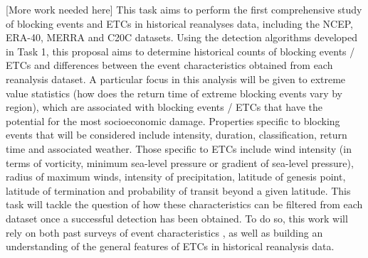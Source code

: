 \documentclass[11pt]{article}
\begin{document}

{\color{red}[More work needed here]} This task aims to perform the first comprehensive study of blocking events and ETCs in historical reanalyses data, including the NCEP, ERA-40, MERRA and C20C datasets.  Using the detection algorithms developed in Task 1, this proposal aims to determine historical counts of blocking events / ETCs and differences between the event characteristics obtained from each reanalysis dataset.  A particular focus in this analysis will be given to extreme value statistics (how does the return time of extreme blocking events vary by region), which are associated with blocking events / ETCs that have the potential for the most socioeconomic damage.  Properties specific to blocking events that will be considered include intensity, duration, classification, return time and associated weather.  Those specific to ETCs include wind intensity (in terms of vorticity, minimum sea-level pressure or gradient of sea-level pressure), radius of maximum winds, intensity of precipitation, latitude of genesis point, latitude of termination and probability of transit beyond a given latitude.  This task will tackle the question of how these characteristics can be filtered from each dataset once a successful detection has been obtained.  To do so, this work will rely on both past surveys of event characteristics \citep{serreze1995climatological}, as well as building an understanding of the general features of ETCs in historical reanalysis data.
\end{document}
